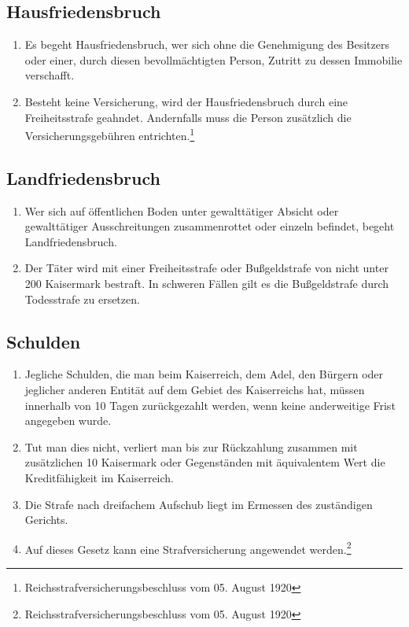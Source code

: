 \documentclass{article}
\begin{document}
\subsection{Hausfriedensbruch}\label{hausfr}
\begin{enumerate}[(1)]
    \item Es begeht Hausfriedensbruch, wer sich ohne die Genehmigung des Besitzers oder einer, durch diesen bevollmächtigten Person, Zutritt zu dessen Immobilie verschafft.
    \item Besteht keine Versicherung, wird der Hausfriedensbruch durch eine Freiheitsstrafe geahndet. Andernfalls muss die Person zusätzlich die Versicherungsgebühren entrichten.\footnote{Reichsstrafversicherungsbeschluss vom 05. August 1920}
\end{enumerate}

\subsection{Landfriedensbruch}
\begin{enumerate}[(1)]
    \item Wer sich auf öffentlichen Boden unter gewalttätiger Absicht oder gewalttätiger Ausschreitungen zusammenrottet oder einzeln befindet, begeht Landfriedensbruch.
    \item Der Täter wird mit einer Freiheitsstrafe oder Bußgeldstrafe von nicht unter 200 Kaisermark bestraft. In schweren Fällen gilt es die Bußgeldstrafe durch Todesstrafe zu ersetzen.
\end{enumerate}

\subsection{Schulden}
\begin{enumerate}[(1)]
    \item Jegliche Schulden, die man beim Kaiserreich, dem Adel, den Bürgern oder jeglicher anderen Entität auf dem Gebiet des Kaiserreichs hat, müssen innerhalb von 10 Tagen zurückgezahlt werden, wenn keine anderweitige Frist angegeben wurde.
    \item Tut man dies nicht, verliert man bis zur Rückzahlung zusammen mit zusätzlichen 10 Kaisermark oder Gegenständen mit äquivalentem Wert die Kreditfähigkeit im Kaiserreich.
    \item Die Strafe nach dreifachem Aufschub liegt im Ermessen des zuständigen Gerichts.
    \item Auf dieses Gesetz kann eine Strafversicherung angewendet werden.\footnote{Reichsstrafversicherungsbeschluss vom 05. August 1920}    
\end{enumerate}
\end{document}
